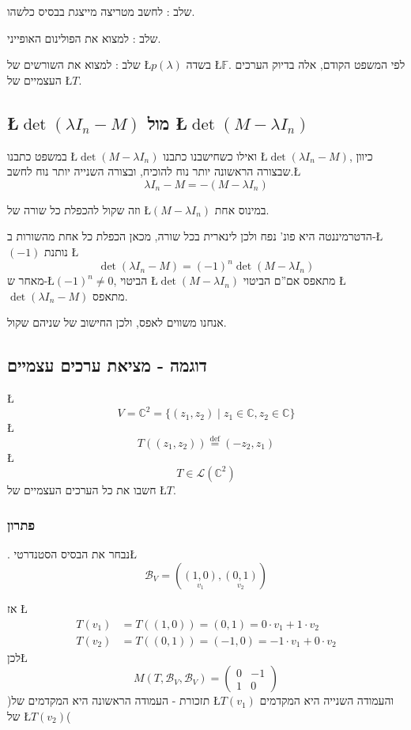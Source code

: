 \documentclass[english,hebrew]{article}
\theoremstyle{plain}
\begin{document}
שלב {\endL}: לחשב מטריצה מייצגת בבסיס כלשהו.

שלב {\endL}: למצוא את הפולינום האופייני.

שלב {\endL}: למצוא את השורשים של \L{$p(\lambda)$} בשדה \L{$\mathbb{F}$}.
לפי המשפט הקודם, אלה בדיוק הערכים העצמיים של \L{$T$}.

\subsection{\L{$\det(\lambda I_{n}-M)$} מול \L{$\det(M-\lambda I_{n})$}}

במשפט כתבנו \L{$\det(M-\lambda I_{n})$} ואילו כשחישבנו כתבנו \L{$\det(\lambda I_{n}-M)$},
כיוון שבצורה הראשונה יותר נוח להוכיח, ובצורה השנייה יותר נוח לחשב.\L{%
\[
\lambda I_{n}-M=-(M-\lambda I_{n})
\]
}%

וזה שקול להכפלת כל שורה של \L{$(M-\lambda I_{n})$} במינוס אחת.

הדטרמיננטה היא פונ' נפח ולכן לינארית בכל שורה, מכאן הכפלת כל אחת מהשורות
ב-\L{$(-1)$} נותנת \L{%
\[
\det(\lambda I_{n}-M)=(-1)^{n}\det(M-\lambda I_{n})
\]
}%
מאחר ש-\L{$(-1)^{n}\neq0$}, הביטוי \L{$\det(M-\lambda I_{n})$} מתאפס
אם\textquotedblright ם הביטוי \L{$\det(\lambda I_{n}-M)$} מתאפס.

אנחנו משווים לאפס, ולכן החישוב של שניהם שקול.

\subsection{דוגמה - מציאת ערכים עצמיים}

\L{%
\[
V=\mathbb{C}^{2}=\{(z_{1},z_{2})\mid z_{1}\in\mathbb{C},z_{2}\in\mathbb{C}\}
\]
}%
\L{%
\[
T((z_{1},z_{2}))\overset{\text{def}}{=}(-z_{2},z_{1})
\]
}%
\L{%
\[
T\in\mathcal{L}(\mathbb{C}^{2})
\]
}%
חשבו את כל הערכים העצמיים של \L{$T$}.

\subsubsection{פתרון}

{\endL}. נבחר את הבסיס הסטנדרטי\L{%
\[
\mathcal{B}_{V}=\left(\underset{v_{1}}{(1,0)},\underset{v_{2}}{(0,1)}\right)
\]
}%

אז \L{%
\begin{align*}
T(v_{1}) & =T((1,0))=(0,1)=0\cdot v_{1}+1\cdot v_{2}\\
T(v_{2}) & =T((0,1))=(-1,0)=-1\cdot v_{1}+0\cdot v_{2}
\end{align*}
}%
לכן\L{%
\[
M(T,\mathcal{B}_{V},\mathcal{B}_{V})=\begin{pmatrix}0 & -1\\
1 & 0
\end{pmatrix}
\]
}%
)תזכורת - העמודה הראשונה היא המקדמים של \L{$T(v_{1})$} והעמודה השנייה
היא המקדמים של \L{$T(v_{2})$}(\\
\end{document}
